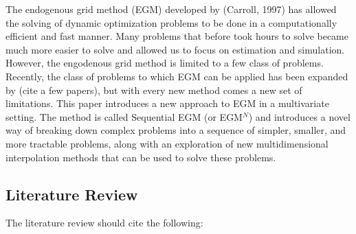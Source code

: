 \documentclass[\econtexRoot/HAFiscal]{subfiles}
\begin{document}




The endogenous grid method (EGM) developed by (Carroll, 1997) has allowed the solving of dynamic optimization problems to be done in a computationally efficient and fast manner. Many problems that before took hours to solve became much more easier to solve and allowed us to focus on estimation and simulation.
However, the engodenous grid method is limited to a few class of problems. Recently, the class of problems to which EGM can be applied has been expanded by (cite a few papers), but with every new method comes a new set of limitations.
This paper introduces a new approach to EGM in a multivariate setting. The method is called Sequential EGM (or EGM$^N$) and introduces a novel way of breaking down complex problems into a sequence of simpler, smaller, and more tractable problems, along with an exploration of new multidimensional interpolation methods that can be used to solve these problems.

\subsection{Literature Review} %

The literature review should cite the following:



\cite{Druedahl2021-wl,Ludwig2018-uz,Ludwig2016-tq,Iskhakov2015-jy,Maliar2013-sv,Carroll2006-wq,Jorgensen2013-du,Maliar2011-dj,White2015-fg,Hintermaier2010-io,Barillas2007-uh,Druedahl2017-vn,Iskhakov2017-my,Mendoza2020-jd,Fella2014-my}
\end{document}

